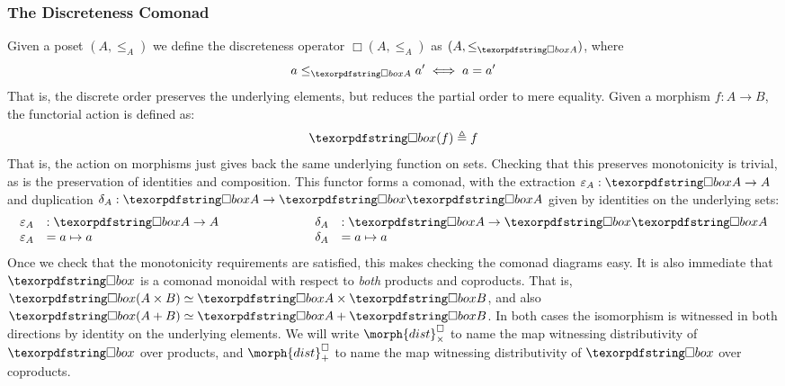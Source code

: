 \subsubsection{The Discreteness Comonad}
Given a poset $(A, \leq_A)$ we define the discreteness operator $\Box(A, \leq_A)$
as $(A, \leq_{\iso A})$, where
\begin{displaymath}
  a \leq_{\iso A} a' \iff a = a'
\end{displaymath}
That is, the discrete order preserves the underlying elements, but reduces the partial order
to mere equality. Given a morphism $f : A \to B$, the functorial
action is defined as:
\begin{displaymath}
  \iso(f) \triangleq f 
\end{displaymath}
That is, the action on morphisms just gives back the same underlying function on sets. Checking
that this preserves monotonicity is trivial, as is the preservation of identities and
composition. This functor forms a comonad, with the extraction $\varepsilon_A : \iso A \to A$
and duplication $\delta_A : \iso A \to \iso \iso A$ given by identities on the underlying
sets:
\begin{displaymath}
  \begin{array}{llcll}
  \varepsilon_A & : \iso A \to A & \hspace{2cm} & \delta_A & : \iso A \to \iso \iso A \\
  \varepsilon_A & = a \mapsto a & & \delta_A & = a \mapsto a 
  \end{array}
\end{displaymath}
Once we check that the monotonicity requirements are satisfied, this
makes checking the comonad diagrams easy. It is also immediate that $\iso$ is a comonad
monoidal with respect to \emph{both} products and coproducts. That is, $\iso (A \times B)
\simeq \iso A \times \iso B$, and also $\iso (A + B) \simeq \iso A + \iso B$. In both
cases the isomorphism is witnessed in both directions by identity on the underlying elements.
We will write $\morph{dist}^\Box_\times$  to name the map witnessing distributivity of $\iso$ over
products, and $\morph{dist}^\Box_+$  to name the map witnessing distributivity of $\iso$ over coproducts.

